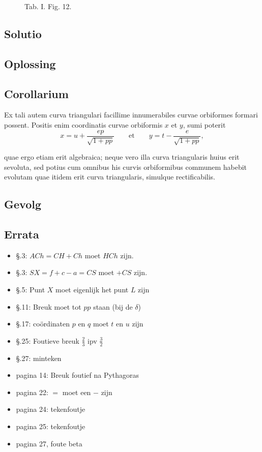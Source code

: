 \documentclass[10pt,a4paper]{article}
\begin{document}
\begin{paracol}{2}
\begin{figure}[h]
{\begin{tikzpicture}[rotate=180, scale=1]
			\end{tikzpicture}}
		\selectfont
		\caption{Tab. I. Fig. 12.}
	\end{figure}
	
	\switchcolumn*
	
	\subsection*{Solutio}
	
	\switchcolumn
	\subsection*{Oplossing}
	\switchcolumn*
	
	\subsection*{Corollarium}
	\par Ex tali autem curva triangulari facillime innumerabiles curvae orbiformes formari possent. Positis enim coordinatis curvae orbiformis $x$ et $y$, sumi poterit
	\[
		x=u+\dfrac{ep}{\sqrt{1+pp}} \qquad \text{et} \qquad y=t-\dfrac{e}{\sqrt{1+pp}},
	\]
	\par quae ergo etiam erit algebraica; neque vero illa curva triangularis huius erit sevoluta, sed potius cum omnibus his curvis orbiformibus communem  habebit evolutam quae itidem erit curva triangularis, simulque rectificabilis.

	\switchcolumn
	\subsection*{Gevolg}
	\switchcolumn*

	\end{paracol}
\newpage

\subsection*{Errata}

\begin{itemize}
	\item \S.3: $ACh = CH+Ch$ moet $HCh$ zijn.
	\item \S.3: $SX = f+c-a = CS$ moet $+CS$ zijn.
	\item \S.5: Punt $X$ moet eigenlijk het punt $L$ zijn
	\item \S.11: Breuk moet tot $pp$ staan (bij de $\delta$)
	\item \S.17: coördinaten $p$ en $q$ moet $t$ en $u$ zijn
	\item \S.25: Foutieve breuk $\frac{2}{3}$ ipv $\frac{3}{2}$
	\item \S.27: minteken
 	\item pagina 14: Breuk foutief na Pythagoras
	\item pagina 22: $=$ moet een $-$ zijn
	\item pagina 24: tekenfoutje
	\item pagina 25: tekenfoutje
	\item pagina 27, foute beta
\end{itemize} 
\end{document}
